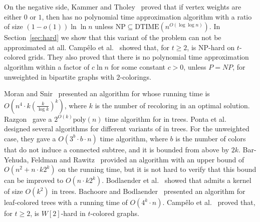 On the negative side, 
Kammer and Tholey~\cite{kammer2012complexity}
proved that if vertex weights are either $0$ or $1$, 
then \TWOCR{} has no polynomial time approximation algorithm with a ratio of size 
$(1 - o(1))\ln\ln n$ 
unless $\text{NP} \subseteq \text{DTIME}(n^{O(\log\log n)})$.
In Section~\ref{sec:hard} we show 
that this variant of the problem can not be approximated at all. 
%
Camp\^{e}lo et al.~\cite{campelo2013complexity} showed that,
for $t \geq 2$, 
\CRP{} is NP-hard on $t$-colored grids. 
%
They also proved that there is no polynomial time approximation algorithm 
within a factor of $c\ln n$ for some constant $c > 0$, 
unless $P = NP$, 
for unweighted \CRP{} in bipartite graphs with $2$-colorings.


Moran and Snir~\cite{MoranSnir08} presented an algorithm for \CRP{}
whose running time is $O(n^4 \cdot k (\frac{k}{\log k})^k)$,
where $k$ is the number of recoloring in an optimal solution.
%
Razgon~\cite{Razgon07} gave a $2^{O(k)} \text{poly}(n)$ time algorithm for \CRP{} in trees.
%
Ponta et al.~\cite{ponta2008speeding} 
designed several algorithms for different variants of \CRP{} in trees. 
%
For the unweighted case, 
they gave a $O(3^b \cdot b \cdot n)$ time algorithm, 
where $b$ is the number of colors that do not induce a connected subtree,
and it is bounded from above by $2k$.
%  
Bar-Yehuda, Feldman and Rawitz~\cite{BFR08} 
provided an algorithm with an upper bound of $O(n^2 + n \cdot k 2^k)$ on the running time, 
but it is not hard to verify that this bound can be improved to $O(n \cdot k 2^k)$.
%
Bodlaender et al.~\cite{BFLRRW11} showed that \CRP{}  admits a kernel of size $O(k^2)$
in trees.
%
Bachoore and Bodlaender~\cite{bachoore2006convex} 
presented an algorithm for leaf-colored trees with a running time of $O(4^k \cdot n)$. 
%
Camp\^{e}lo et al.~\cite{campelo2013complexity} proved that, 
for $t \geq 2$, 
\CRP{} is $W[2]$-hard in $t$-colored graphs.


